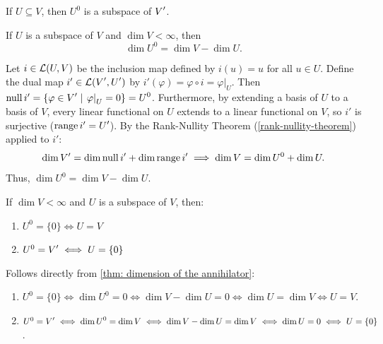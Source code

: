 \setcounter{thm}{123}
\begin{thm}
  \label{thm: the annihilator is a subspace}
  If $U \subseteq V$, then $U^{0}$ is a subspace of $\displaystyle V'$.
\end{thm}

\setcounter{thm}{124}
\begin{thm} 
  \label{thm: dimension of the annihilator}
  If $U$ is a subspace of $V$ and $\dim V < \infty$, then
  \begin{equation}
    \dim U^0 = \dim V - \dim U.
  \end{equation}
\end{thm}
\begin{prf}
  Let $i \in \mathcal{L}(U, V)$ be the inclusion map defined by $i(u) = u$ for all $u \in U$.
  Define the dual map $i' \in \mathcal{L}(\displaystyle V', \displaystyle U')$ by $i'(\varphi) = \varphi \circ i = \left.\varphi\right|_U$.
  Then $\operatorname{null} i' = \{\varphi \in \displaystyle V' \mid \left.\varphi\right|_U = 0\} = U^0$.
  Furthermore, by extending a basis of $U$ to a basis of $V$, every linear functional on $U$ extends to a linear functional on $V$, so $i'$ is surjective ($\operatorname{range} i' = \displaystyle U'$).
  By the Rank-Nullity Theorem (\ref{rank-nullity-theorem}) applied to $i'$:
  \begin{equation}
    \dim \displaystyle V' = \dim \operatorname{null} i' + \dim \operatorname{range} i' \implies \dim V = \dim U^0 + \dim U.
  \end{equation}
  Thus, $\dim U^0 = \dim V - \dim U$.
\end{prf}

\setcounter{thm}{126}
\begin{thm} 
  If $\dim V < \infty$ and $U$ is a subspace of $V$, then:
  \begin{enumerate}[label=\textbf{(\alph*)}]
    \item $U^0 = \{0 \} \iff U = V$
    \item $U^0 = \displaystyle V' \iff U = \{0\}$
   \end{enumerate}
\end{thm}
\begin{prf}
  Follows directly from \ref{thm: dimension of the annihilator}:
  \begin{enumerate}[label=\textbf{(\alph*)}]
    \item $U^0 = \{0\} \iff \dim U^0 = 0 \iff \dim V - \dim U = 0 \iff \dim U = \dim V \iff U = V$.
    \item $U^0 = \displaystyle V' \iff \dim U^0 = \dim V \iff \dim V - \dim U = \dim V \iff \dim U = 0 \iff U = \{0\}$.
  \end{enumerate}
  \vspace{-\baselineskip}
\end{prf}

